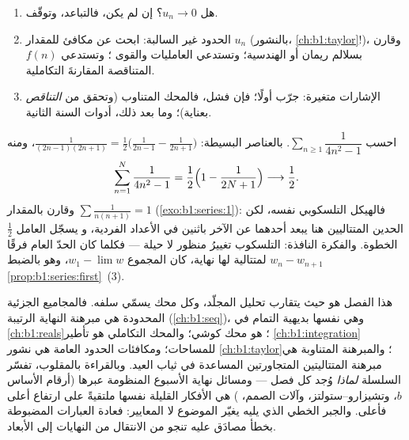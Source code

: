 \begin{method}\label{met:b1:series:decide}
\begin{enumerate}
  \item هل $u_n \to 0$؟ إن لم يكن، فالتباعد، وتوقّف.
  \item الحدود غير السالبة: ابحث عن مكافئ للمقدار $u_n$ (بالنشور،
        \cref{ch:b1:taylor}!)، وقارن بسلالم ريمان أو
        الهندسية؛ وتستدعي العامليات والقوى ؛
        وتستدعي $f(n)$ المتناقصة المقارنةَ التكاملية.
  \item الإشارات متغيرة: جرّب  أولًا؛ فإن فشل، فالمحك
        المتناوب (وتحقق من \emph{التناقص} بعناية)؛ وما بعد
        ذلك، أدوات السنة الثانية.
\end{enumerate}
\end{method}

\begin{example}\label{ex:b1:series:oddtelescope}
احسب $\sum_{n \geq 1} \dfrac{1}{4n^2 - 1}$. بالعناصر
البسيطة: $\frac{1}{(2n-1)(2n+1)} =
\frac12\bigl(\frac{1}{2n-1} - \frac{1}{2n+1}\bigr)$، ومنه
\[
\sum_{n=1}^{N} \frac{1}{4n^2 - 1}
= \frac12\Bigl(1 - \frac{1}{2N+1}\Bigr)
\longrightarrow \frac12 .
\]
وقارن بالمقدار $\sum \frac{1}{n(n+1)} = 1$
(\cref{exo:b1:series:1}): فالهيكل التلسكوبي نفسه، لكن
الحدين المتتاليين هنا يبعد أحدهما عن الآخر باثنين في الأعداد الفردية، و
يسجّل العامل $\frac12$ الخطوة. والفكرة النافذة:
التلسكوب تغييرُ منظور لا حيلة --- فكلما كان
الحدّ العام فرقًا $w_n - w_{n+1}$ لمتتالية
لها نهاية، كان المجموع $w_1 - \lim w$، وهو بالضبط
\cref{prop:b1:series:first}~(3).
\end{example}

\begin{remark}
هذا الفصل هو حيث يتقارب تحليل المجلّد، وكل
محك يسمّي سلفه. فالمجاميع الجزئية المحدودة هي مبرهنة النهاية
الرتيبة (\cref{ch:b1:seq})، وهي نفسها بديهية التمام
في \cref{ch:b1:reals}؛  هو محك
كوشي؛ والمحك التكاملي هو تأطير \cref{ch:b1:integration}
للمساحات؛ ومكافئات الحدود العامة هي
نشور \cref{ch:b1:taylor}؛ والمبرهنة المتناوبة هي
مبرهنة المتتاليتين المتجاورتين المساعدة في ثياب العيد. وبالقراءة
بالمقلوب، تفسّر السلسلة \emph{لماذا} وُجد كل فصل
--- ومسائل نهاية الأسبوع المنظومة عبرها
(أرقام الأساس $b$، وتشيزارو--ستولتز، وآلات الصمم،
) هي الأفكار القليلة نفسها ملتقيةً على ارتفاع
أعلى فأعلى. والجبر الخطي الذي يليه يغيّر
الموضوع لا المعايير: فعادة العبارات المضبوطة بخطأ
مصادَق عليه تنجو من الانتقال من النهايات إلى الأبعاد.
\end{remark}

